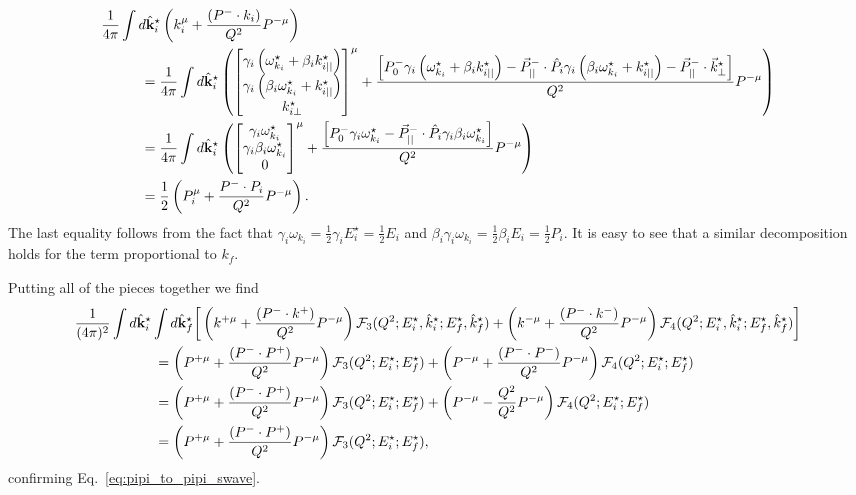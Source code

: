 \begin{align}
\frac{1}{4\pi}\int d\hat{\bf k}^\star_i
\left(k^{\mu}_i+\frac{(P^-\cdot k_i)}{Q^2} P^{-\mu}\right)
&
 \nn\\
 &\hspace{-4cm}
 =\frac{1}{4\pi}\int d\hat{\bf k}^\star_i
\left(
\begin{bmatrix} 
\gamma_i\left(\omega_{k_i}^\star+\beta_ik_{i||}^\star\right)\\
\gamma_i\left(\beta_i\omega_{k_i}^\star+k_{i||}^\star\right)\\
 k^\star_{i\perp}
 \end{bmatrix}^\mu
+
\frac{\left[P^-_0\gamma_i\left(\omega_{k_i}^\star+\beta_ik_{i||}^\star\right)-\vec{P}^-_{||}\cdot\hat{P}_i \gamma_i\left(\beta_i\omega_{k_i}^\star+k_{i||}^\star\right) - \vec{P}^-_{||}\cdot\vec{k}^\star_\perp\right]}{Q^2} P^{-\mu}\right)
 \nn\\
 &\hspace{-4cm}
 =\frac{1}{4\pi}\int d\hat{\bf k}^\star_i
\left(
\begin{bmatrix} 
\gamma_i\omega_{k_i}^\star\\
\gamma_i \beta_i\omega_{k_i}^\star\\
0
 \end{bmatrix}^\mu
+
\frac{\left[P^-_0\gamma_i\omega_{k_i}^\star-\vec{P}^-_{||}\cdot\hat{P}_i \gamma_i\beta_i\omega_{k_i}^\star\right]}{Q^2} P^{-\mu}\right)
 \nn\\
  &\hspace{-4cm}
=
\frac{1}{2}\left(
P^\mu_i
+
\frac{P^-\cdot P_i}{Q^2} P^{-\mu}\right).
\end{align}
The last equality follows from the fact that $\gamma_i\omega_{k_i}=\frac{1}{2}\gamma_iE^\star_i=\frac{1}{2}E_i$ and $\beta_i\gamma_i\omega_{k_i}=\frac{1}{2}\beta_iE_i=\frac{1}{2}{P}_i$. It is easy to see that a similar decomposition holds for the term proportional to $k_f$.

Putting all of the pieces together we find
\begin{align}
&\frac{1}{(4\pi)^2}\int d\hat{\bf k}^\star_i\int d\hat{\bf k}^\star_f\bigg[
\left(k^{+\mu}+\frac{(P^-\cdot k^{+})}{Q^2} P^{-\mu}\right)
\mathcal{F}_{3}(Q^2;E_i^\star,\hat{k}^\star_i;E_f^\star,\hat{k}^\star_f)
+
\left(k^{-\mu}+\frac{(P^-\cdot k^{-})}{Q^2} P^{-\mu}\right)
\mathcal{F}_{4}(Q^2;E_i^\star,\hat{k}^\star_i;E_f^\star,\hat{k}^\star_f)\bigg]
\nonumber\\
&\hspace{2cm}=
\left(P^{+\mu}+\frac{(P^-\cdot P^{+})}{Q^2} P^{-\mu}\right)
\mathcal{F}_{3}(Q^2;E_i^\star;E_f^\star)
+
\left(P^{-\mu}+\frac{(P^-\cdot P^{-})}{Q^2} P^{-\mu}\right)
\mathcal{F}_{4}(Q^2;E_i^\star;E_f^\star)
\nonumber\\
&\hspace{2cm}=
\left(P^{+\mu}+\frac{(P^-\cdot P^{+})}{Q^2} P^{-\mu}\right)
\mathcal{F}_{3}(Q^2;E_i^\star;E_f^\star)
+
\left(P^{-\mu}-\frac{Q^2}{Q^2} P^{-\mu}\right)
\mathcal{F}_{4}(Q^2;E_i^\star;E_f^\star)
\nonumber\\
&\hspace{2cm}=
\left(P^{+\mu}+\frac{(P^-\cdot P^{+})}{Q^2} P^{-\mu}\right)
\mathcal{F}_{3}(Q^2;E_i^\star;E_f^\star),
\end{align}
confirming Eq.~\ref{eq:pipi_to_pipi_swave}. 

